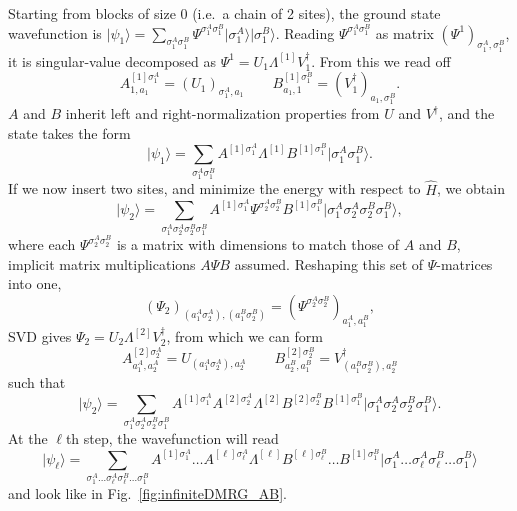 \documentclass[a4paper,10pt,oneside,onecolumn,1p,times]{elsarticle}
\newcommand{\ket}[1]{\mbox{$| #1  \rangle$}}
\begin{document}
Starting from blocks of size 0 (i.e.\ a chain of 2 sites), the ground state wavefunction is $\ket{\psi_1}=\sum_{\sigma_1^A \sigma_1^B} \Psi^{\sigma_1^A \sigma_1^B} \ket{\sigma_1^A} \ket{\sigma_1^B}$. Reading $\Psi^{\sigma_1^A\sigma_1^B}$ as matrix $(\Psi^1)_{\sigma_1^A,\sigma_1^B}$, it is singular-value decomposed as  $\Psi^1=U_1 \Lambda^{[1]} V^\dagger_1$. From this we read off
\begin{equation}
A^{[1]\sigma_1^A}_{1,a_1} = (U_1)_{\sigma_1^A,a_1} \quad\quad B^{[1]\sigma_1^B}_{a_1,1} = (V^\dagger_1)_{a_1,\sigma_1^B} .
\end{equation} 
$A$ and $B$ inherit left and right-normalization properties from $U$ and $V^\dagger$, and the state takes the form
\begin{equation}
\ket{\psi_1} = \sum_{\sigma_1^A \sigma_1^B} A^{[1]\sigma_1^A} \Lambda^{[1]} B^{[1]\sigma_1^B} \ket{\sigma_1^A \sigma_1^B} .
\end{equation}
If we now insert two sites, and minimize the energy with respect to $\hat{H}$, we obtain
\begin{equation}
\ket{\psi_2} = \sum_{\sigma_1^A \sigma_2^A \sigma_2^B \sigma_1^B} A^{[1]\sigma_1^A} 
\Psi^{\sigma_2^A \sigma_2^B} 
B^{[1]\sigma_1^B} \ket{\sigma_1^A \sigma_2^A \sigma_2^B \sigma_1^B},
\end{equation}
where each $\Psi^{\sigma_2^A \sigma_2^B}$ is a matrix with dimensions to match those of $A$ and $B$, implicit matrix multiplications $A\Psi B$ assumed. Reshaping this set of $\Psi$-matrices into one,
\begin{equation}
(\Psi_2)_{(a_1^A \sigma_2^A),(a_1^B \sigma_2^B)} =  (\Psi^{\sigma_2^A \sigma_2^B})_{a_1^A,a_1^B},
\end{equation}
SVD gives $\Psi_2 = U_2 \Lambda^{[2]} V^\dagger_2$, from which we can form
\begin{equation}
A^{[2]\sigma_2^A}_{a_1^A,a_2^A} = U_{(a_1^A \sigma_2^A), a_2^A} \quad\quad  
B^{[2]\sigma_2^B}_{a_2^B,a_1^B} = V^\dagger_{(a_1^B \sigma_2^B), a_2^B}
\end{equation}
such that 
\begin{equation}
\ket{\psi_2} = \sum_{\sigma_1^A \sigma_2^A \sigma_2^B \sigma_1^B} 
A^{[1]\sigma_1^A}A^{[2]\sigma_2^A} \Lambda^{[2]} B^{[2]\sigma_2^B}B^{[1]\sigma_1^B} 
\ket{\sigma_1^A \sigma_2^A \sigma_2^B \sigma_1^B}.
\end{equation}
At the $\ell$th step, the wavefunction will read
\begin{equation}
\ket{\psi_\ell} = \sum_{\sigma_1^A \ldots \sigma_\ell^A \sigma_\ell^B \ldots \sigma_1^B} 
A^{[1]\sigma_1^A} \ldots A^{[\ell]\sigma_\ell^A} \Lambda^{[\ell]} B^{[\ell]\sigma_\ell^B} \ldots B^{[1]\sigma_1^B}  
\ket{\sigma_1^A \ldots \sigma_\ell^A \sigma_\ell^B \ldots \sigma_1^B}
\end{equation}
and look like in Fig.~\ref{fig:infiniteDMRG_AB}.
\end{document}
